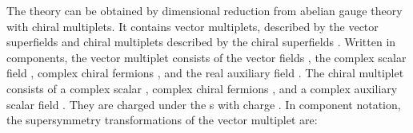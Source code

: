 \documentclass[a4paper,12pt]{article}
\begin{document}
The theory can be obtained by dimensional reduction from
\coordHE{} abelian gauge theory with chiral multiplets.  It contains \coordHE{}  \coordHE{} vector multiplets, described by the vector superfields \coordHE{} and \coordHE{} chiral multiplets described by the chiral
superfields \coordHE{}. Written in components, the vector
multiplet consists of the vector fields \coordHE{}, the
complex scalar field \coordHE{}, complex chiral fermions
\coordHE{}, and the real auxiliary field \coordHE{}.  The chiral
multiplet consists of a complex scalar \coordHE{}, complex chiral fermions
\coordHE{}, and a complex auxiliary scalar field \coordHE{}. They are
charged under the \coordHE{}s with charge \coordHE{}. In component notation, the
supersymmetry transformations of the vector multiplet are: 
\end{document}
